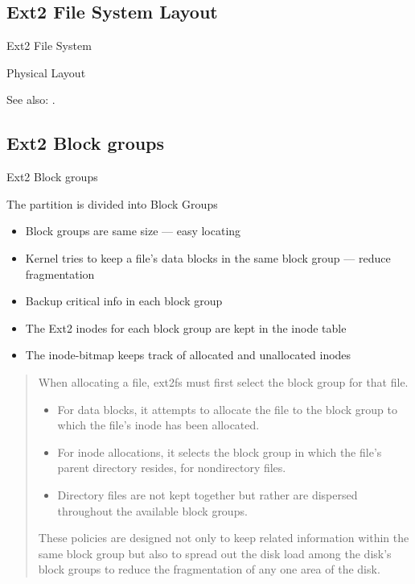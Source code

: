 \subsection{Ext2 File System Layout}

\begin{frame}{Ext2 File System}
  \begin{iblock}{Physical Layout}
    \begin{center}
    \end{center}
  \end{iblock}
\end{frame}

See also: .

\subsection{Ext2 Block groups}

\begin{frame}{Ext2 Block groups}
  \begin{block}{The partition is divided into \alert{Block Groups}}
    \begin{itemize}
    \item Block groups are same size --- easy locating
    \item Kernel tries to keep a file's data blocks in the same block group --- reduce
      fragmentation
    \item Backup critical info in each block group
    \item The Ext2 inodes for each block group are kept in the \alert{inode
        table}
    \item The \alert{inode-bitmap} keeps track of allocated and unallocated
      inodes
    \end{itemize}
  \end{block}
\end{frame}

\begin{quote}
  When allocating a file, ext2fs must first select the block group for that
  file.
  \begin{itemize}
  \item For data blocks, it attempts to allocate the file to the block group to which the
    file's inode has been allocated.
  \item For inode allocations, it selects the block group in which the file's parent
    directory resides, for nondirectory files.
  \item Directory files are not kept together but rather are dispersed throughout the
    available block groups.
  \end{itemize}
  These policies are designed not only to keep related information within the same block
  group but also to spread out the disk load among the disk's block groups to reduce the
  fragmentation of any one area of the disk.
\end{quote}

